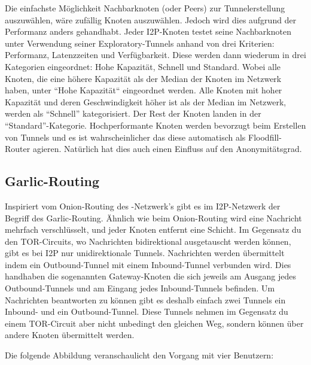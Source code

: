Die einfachste Möglichkeit Nachbarknoten (oder Peers) zur Tunnelerstellung auszuwählen, wäre zufällig Knoten auszuwählen.
Jedoch wird dies aufgrund der Performanz anders gehandhabt.
Jeder I2P-Knoten testet seine Nachbarknoten unter Verwendung seiner Exploratory-Tunnels anhand von drei Kriterien:
Performanz, Latenzzeiten und Verfügbarkeit.
Diese werden dann wiederum in drei Kategorien eingeordnet: Hohe Kapazität, Schnell und Standard.
Wobei alle Knoten, die eine höhere Kapazität als der Median der Knoten im Netzwerk haben, unter ``Hohe Kapazität`` eingeordnet werden.
Alle Knoten mit hoher Kapazität und deren Geschwindigkeit höher ist als der Median im Netzwerk, werden als ``Schnell'' kategorisiert. Der Rest der Knoten landen in der ``Standard''-Kategorie.
Hochperformante Knoten werden bevorzugt beim Erstellen von Tunnels und es ist wahrscheinlicher das diese automatisch als Floodfill-Router agieren.
Natürlich hat dies auch einen Einfluss auf den Anonymitätsgrad.
\parencites[S.~4-5]{timpanaro_monitoring_2011}[S. 3]{liu_empirical_2014}

\subsection{Garlic-Routing}\label{sec:garlic_routing}

Inspiriert vom Onion-Routing des -Netzwerk's gibt es im I2P-Netzwerk der Begriff des Garlic-Routing.
Ähnlich wie beim Onion-Routing wird eine Nachricht mehrfach verschlüsselt, und jeder Knoten entfernt eine Schicht.
Im Gegensatz du den TOR-Circuits, wo Nachrichten bidirektional ausgetauscht werden können, gibt es bei I2P nur unidirektionale Tunnels.
Nachrichten werden übermittelt indem ein Outbound-Tunnel mit einem Inbound-Tunnel verbunden wird.
Dies handhaben die sogenannten Gateway-Knoten die sich jeweils am Ausgang jedes Outbound-Tunnels und am Eingang jedes Inbound-Tunnels befinden.
Um Nachrichten beantworten zu können gibt es deshalb einfach zwei Tunnels ein Inbound- und ein Outbound-Tunnel.
Diese Tunnels nehmen im Gegensatz du einem TOR-Circuit aber nicht unbedingt den gleichen Weg, sondern können über andere Knoten übermittelt werden.

Die folgende Abbildung  veranschaulicht den Vorgang mit vier Benutzern:

